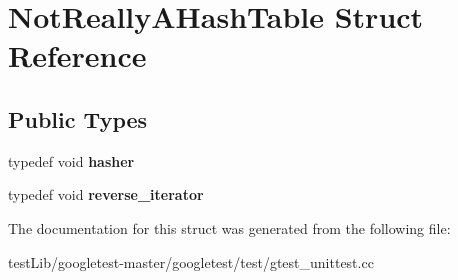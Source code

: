 \hypertarget{structNotReallyAHashTable}{}\section{Not\+Really\+A\+Hash\+Table Struct Reference}
\label{structNotReallyAHashTable}
\subsection*{Public Types}
\begin{DoxyCompactItemize}
\item 
\mbox{\label{structNotReallyAHashTable_a0206bef6150919c8ba5d539d5bf555f7}} 
typedef void {\bfseries hasher}
\item 
\mbox{\label{structNotReallyAHashTable_a8dbee2a2a80768191c736fb57367cfe7}} 
typedef void {\bfseries reverse\+\_\+iterator}
\end{DoxyCompactItemize}


The documentation for this struct was generated from the following file\+:\begin{DoxyCompactItemize}
\item 
test\+Lib/googletest-\/master/googletest/test/gtest\+\_\+unittest.\+cc\end{DoxyCompactItemize}
